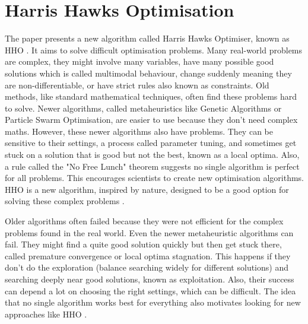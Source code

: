 \documentclass[a4paper, 12pt]{extarticle}
\begin{document}
\section{Harris Hawks Optimisation}
The paper presents a new algorithm called Harris Hawks Optimiser, known as HHO \cite{heidari2019harris}. It aims to solve difficult optimisation problems. Many real-world problems are complex, they might involve many variables, have many possible good solutions which is called multimodal behaviour, change suddenly meaning they are non-differentiable, or have strict rules also known as constraints. Old methods, like standard mathematical techniques, often find these problems hard to solve. Newer algorithms, called metaheuristics like Genetic Algorithms or Particle Swarm Optimisation, are easier to use because they don't need complex maths. However, these newer algorithms also have problems. They can be sensitive to their settings, a process called parameter tuning, and sometimes get stuck on a solution that is good but not the best, known as a local optima. Also, a rule called the "No Free Lunch" theorem suggests no single algorithm is perfect for all problems. This encourages scientists to create new optimisation algorithms. HHO is a new algorithm, inspired by nature, designed to be a good option for solving these complex problems \cite{heidari2019harris}.

Older algorithms often failed because they were not efficient for the complex problems found in the real world. Even the newer metaheuristic algorithms can fail. They might find a quite good solution quickly but then get stuck there, called premature convergence or local optima stagnation. This happens if they don't do the exploration (balance searching widely for different solutions) and searching deeply near good solutions, known as exploitation. Also, their success can depend a lot on choosing the right settings, which can be difficult. The idea that no single algorithm works best for everything also motivates looking for new approaches like HHO \cite{heidari2019harris}.
\end{document}
